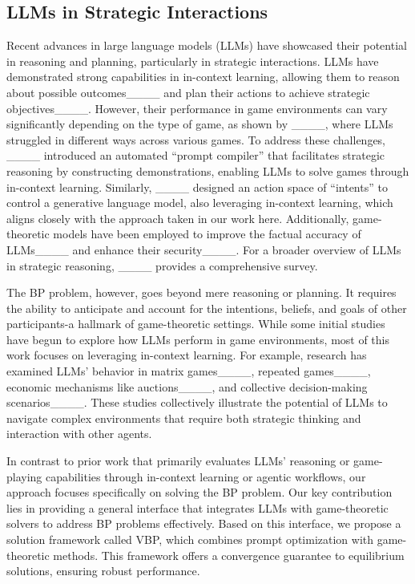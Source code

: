 \subsection{LLMs in Strategic Interactions}

Recent advances in large language models (LLMs) have showcased their potential in reasoning and planning, particularly in strategic interactions. 
LLMs have demonstrated strong capabilities in in-context learning, allowing them to reason about possible outcomes____ and plan their actions to achieve strategic objectives____. 
However, their performance in game environments can vary significantly depending on the type of game, as shown by ____, where LLMs struggled in different ways across various games. 
To address these challenges, ____ introduced an automated ``prompt compiler'' that facilitates strategic reasoning by constructing demonstrations, enabling LLMs to solve games through in-context learning. 
Similarly, ____ designed an action space of ``intents'' to control a generative language model, also leveraging in-context learning, which aligns closely with the approach taken in our work here. 
Additionally, game-theoretic models have been employed to improve the factual accuracy of LLMs____ and enhance their security____. 
For a broader overview of LLMs in strategic reasoning, ____ provides a comprehensive survey.

The BP problem, however, goes beyond mere reasoning or planning. 
It requires the ability to anticipate and account for the intentions, beliefs, and goals of other participants-a hallmark of game-theoretic settings. 
While some initial studies have begun to explore how LLMs perform in game environments, most of this work focuses on leveraging in-context learning. 
For example, research has examined LLMs' behavior in matrix games____, repeated games____, economic mechanisms like auctions____, and collective decision-making scenarios____. 
These studies collectively illustrate the potential of LLMs to navigate complex environments that require both strategic thinking and interaction with other agents.

In contrast to prior work that primarily evaluates LLMs' reasoning or game-playing capabilities through in-context learning or agentic workflows, our approach focuses specifically on solving the BP problem. 
Our key contribution lies in providing a general interface that integrates LLMs with game-theoretic solvers to address BP problems effectively. 
Based on this interface, we propose a solution framework called VBP, which combines prompt optimization with game-theoretic methods. 
This framework offers a convergence guarantee to equilibrium solutions, ensuring robust performance.

